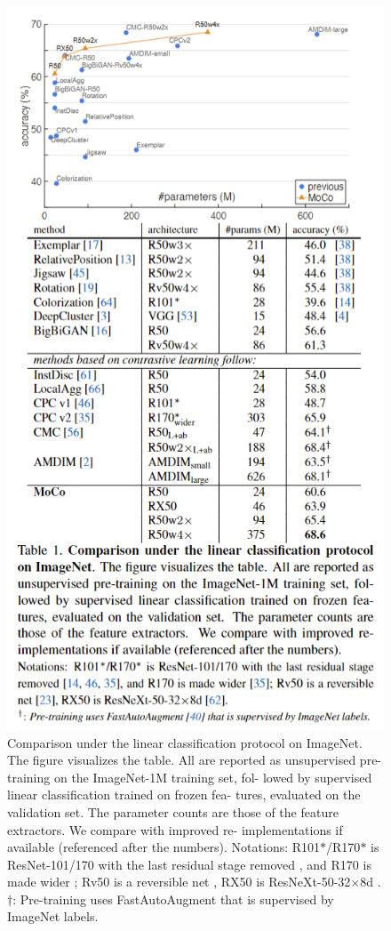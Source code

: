 \documentclass[10pt,twocolumn]{article}  %
\begin{document}
\begin{figure}[htbp]
    \centering
    \includegraphics[width=0.8\linewidth]{Pic/table1.png} %
    \caption{Comparison under the linear classiﬁcation protocol
    on ImageNet. The ﬁgure visualizes the table. All are reported as
    unsupervised pre-training on the ImageNet-1M training set, fol-
    lowed by supervised linear classiﬁcation trained on frozen fea-
    tures, evaluated on the validation set. The parameter counts are
    those of the feature extractors. We compare with improved re-
    implementations if available (referenced after the numbers).
    Notations: R101$\ast $/R170$\ast $ is ResNet-101/170 with the last residual stage
    removed \cite{14_doersch2017multi, 46_oord2018representation, 35_henaff2019data},
    and R170 is made wider \cite{35_henaff2019data}; Rv50 is a reversible
    net \cite{23_gomez2017reversible}, RX50 is ResNeXt-50-32$\times $8d \cite{62_xie2017residual}.
    $\dagger$: Pre-training uses FastAutoAugment \cite{40_lim2019fast} that is supervised by ImageNet labels.} %
    \label{fig:Table 1} %
\end{figure}
\end{document}
